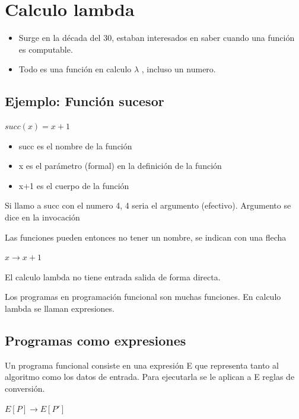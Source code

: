 \section{Calculo lambda}
\begin{itemize}
\item Surge en la década del 30, estaban interesados en saber cuando una función es computable.
\item Todo es una función en calculo $\lambda$ , incluso un numero.
\end{itemize}

\subsection*{Ejemplo: Función sucesor}
\begin{center}
    $succ(x) = x + 1$
\end{center}


\begin{itemize}
\item succ es el nombre de la función
\item x es el parámetro (formal) en la definición de la función
\item x+1 es el cuerpo de la función
\end{itemize}


Si llamo a succ con el numero 4, 4 seria el argumento (efectivo). Argumento se dice en la invocación

Las funciones pueden entonces no tener un nombre, se indican con una flecha

\begin{center}
$x \rightarrow x + 1$
\end{center}

El calculo lambda no tiene entrada salida de forma directa.

Los programas en programación funcional son muchas funciones. En calculo lambda se llaman expresiones.

\subsection*{Programas como expresiones}

Un programa funcional consiste en una expresión E que representa tanto al algoritmo como los datos de entrada. Para ejecutarla se le aplican a E reglas de conversión.

\begin{center}
$E[P] \rightarrow E[P']$
\end{center}


